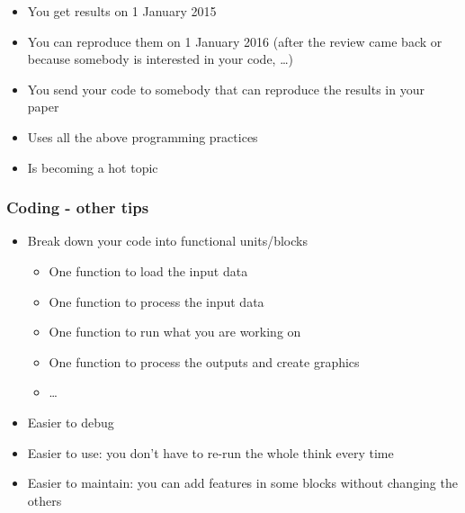 \documentclass[screen, aspectratio=43]{beamer}
\begin{document}
\begin{frame}
\begin{itemize}
  \begin{itemize}[<only@4>]
  \item You get results on 1 January 2015
  \item You can reproduce them on 1 January 2016 (after the review came back or because somebody is interested in your code, \ldots)
  \item You send your code to somebody that can reproduce the results in your paper
  \item Uses all the above programming practices
  \item Is becoming a hot topic
  \end{itemize}
\end{itemize}
\end{frame}

\begin{frame}
  \frametitle{Coding - other tips}
  \begin{itemize}
  \item Break down your code into functional units/blocks
    \begin{itemize}
    \item One function to load the input data
    \item One function to process the input data
    \item One function to run what you are working on
    \item One function to process the outputs and create graphics
    \item \ldots
    \end{itemize}
  \item Easier to debug
  \item Easier to use: you don't have to re-run the whole think every time
  \item Easier to maintain: you can add features in some blocks without changing the others
  \end{itemize}
\end{frame}
\end{document}
